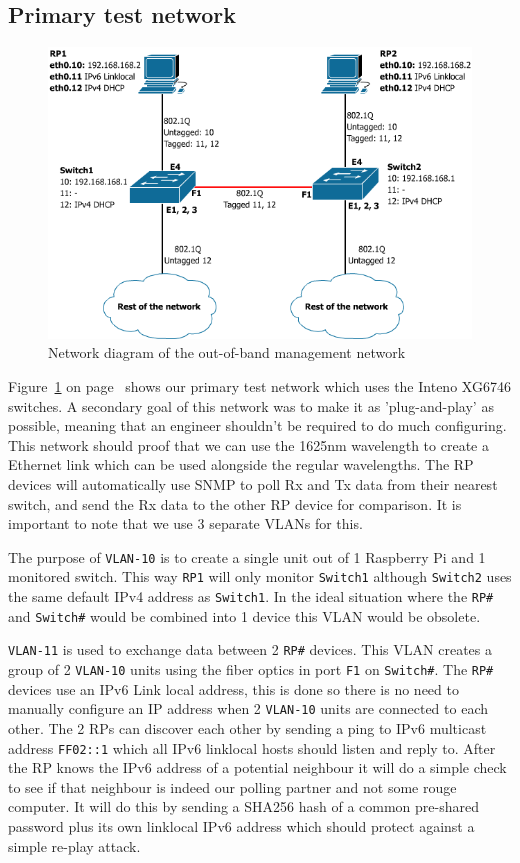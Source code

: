 \documentclass{article}
\begin{document}
\subsection{Primary test network}
\label{sec:prinet}
\begin{figure}[h]
\centerline{\includegraphics[scale=0.4]{images/PoC_all.png}}
\caption{Network diagram of the out-of-band management network}
\label{fig:poc_all}
\end{figure}

Figure~\ref{fig:poc_all} on page~\pageref{fig:poc_all} shows our primary test network which uses the Inteno XG6746 switches. A secondary goal of this network was to make it as 'plug-and-play' as possible, meaning that an engineer shouldn't be required to do much configuring. This network should proof that we can use the 1625nm wavelength to create a Ethernet link which can be used alongside the regular wavelengths. The RP devices will automatically use SNMP to poll Rx and Tx data from their nearest switch, and send the Rx data to the other RP device for comparison. It is important to note that we use 3 separate VLANs for this. 

The purpose of \texttt{VLAN-10} is to create a single unit out of 1 Raspberry Pi and 1 monitored switch. This way \texttt{RP1} will only monitor \texttt{Switch1} although \texttt{Switch2} uses the same default IPv4 address as \texttt{Switch1}. In the ideal situation where the \texttt{RP\#} and \texttt{Switch\#} would be combined into 1 device this VLAN would be obsolete.

\texttt{VLAN-11} is used to exchange data between 2 \texttt{RP\#} devices. This VLAN creates a group of 2 \texttt{VLAN-10} units using the fiber optics in port \texttt{F1} on \texttt{Switch\#}. The \texttt{RP\#} devices use an IPv6 Link local address, this is done so there is no need to manually configure an IP address when 2 \texttt{VLAN-10} units are connected to each other. The 2 RPs can discover each other by sending a ping to IPv6 multicast address \texttt{FF02::1} which all IPv6 linklocal hosts should listen and reply to\cite{ietf:rfc4291}. After the RP knows the IPv6 address of a potential neighbour it will do a simple check to see if that neighbour is indeed our polling partner and not some rouge computer. It will do this by sending a SHA256 hash of a common pre-shared password plus its own linklocal IPv6 address which should protect against a simple re-play attack.
\end{document}
